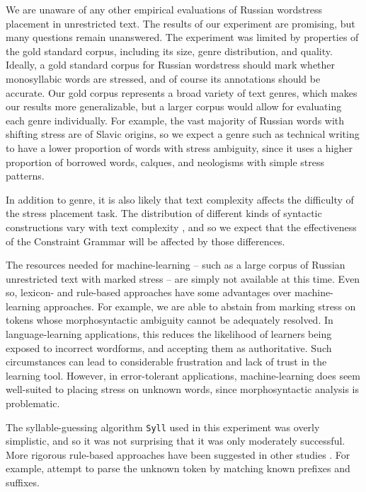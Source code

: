 \documentclass[11pt]{article}
\begin{document}
We are unaware of any other empirical evaluations of Russian wordstress placement 
in unrestricted text. The results of our experiment are promising, but many 
questions remain unanswered.
The experiment was limited by properties of the gold standard corpus, including
its size, genre distribution, and quality. Ideally, a gold standard corpus for 
Russian wordstress should mark 
whether monosyllabic words are stressed, and of course its annotations should
be accurate. Our gold corpus represents a broad variety of text genres, which 
makes our results more generalizable, but a larger corpus would allow for
evaluating each genre individually. For example, the vast majority of Russian
words with shifting stress are of Slavic origins, so we expect a genre such as 
technical writing to have a lower proportion of words with stress ambiguity, 
since it uses a higher proportion of borrowed words, calques, and neologisms with 
simple stress patterns.

In addition to genre, it is also likely that text
complexity affects the difficulty of the stress placement task. The distribution
of different kinds of syntactic constructions vary with text complexity 
\cite{Vajjala.Meurers-12}, and so we expect that the effectiveness of the 
Constraint Grammar will be affected by those differences.

The resources needed for machine-learning -- such as a large corpus of Russian 
unrestricted text with marked stress -- are simply
not available at this time. Even so, lexicon- and rule-based approaches have
some advantages over machine-learning approaches. For example, we are able to
abstain from marking stress on tokens whose morphosyntactic ambiguity cannot be
adequately resolved. In language-learning applications, this reduces the 
likelihood of learners being exposed to incorrect wordforms, and accepting them
as authoritative. Such circumstances can lead to considerable frustration and
lack of trust in the learning tool. However, in error-tolerant applications, 
machine-learning does seem well-suited to placing stress on unknown words, since 
morphosyntactic analysis is problematic.

The syllable-guessing algorithm {\small {\tt Syll}} used in this 
experiment was overly simplistic, and so it was not surprising that it was only 
moderately successful. More rigorous rule-based approaches have been suggested in 
other studies \cite{Church-85,Williams-87,Xomicevic_2008}. For example, 
 attempt to parse the unknown token by matching known 
prefixes and suffixes.
\end{document}
